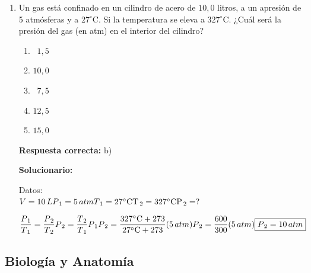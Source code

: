 \begin{enumerate}[resume]
	
	\item Un gas está confinado en un cilindro de acero de $10,0$ litros, a un apresión de 5 atmósferas y a $27^\circ$C. Si la temperatura se eleva a  $327^\circ$C. ¿Cuál será la presión del gas (en atm) en el interior del cilindro?
	
	\begin{enumerate}[label=\alph*)]
		\item $\,\,\,1,5$
		\item $10,0$
		\item $\,\,\,7,5$
		\item $12,5$
		\item $15,0$
	\end{enumerate}
	
	\textbf{Respuesta correcta:} b)
	
	\vspace{2mm}
	\textbf{Solucionario:}\\
	
	
	\begin{minipage}[t]{0.45\textwidth}
		Datos:\\
		$V = 10\,L\\
		{P_{\,1}} = 5\,atm\\
		{T_{\,1}} = 27^\circ \rm{C}\\
		{T_{\,2}} = 327^\circ \rm{C}\\
		{P_{\,2}} = ?$
	\end{minipage}
	\hfill
	\begin{minipage}[t]{0.45\textwidth}
		$\dfrac{{{P_{\,1}}}}{{{T_{\,1}}}} = \dfrac{{{P_{\,2}}}}{{{T_{\,2}}}}\\\\
		{P_{\,2}} = \dfrac{{{T_{\,2}}}}{{{T_{\,1}}}}{P_{\,1}}\\\\
		{P_{\,2}} = \dfrac{{327^\circ \rm{C} + 273}}{{27^\circ \rm{C} + 273}}(5\,atm)\\\\
		{P_{\,2}} = \dfrac{{600}}{{300}}(5\,atm)\\\\
		\boxed{{P_{\,2}} = 10\,atm}$
	\end{minipage}
\end{enumerate}

\subsection*{Biología y Anatomía}

